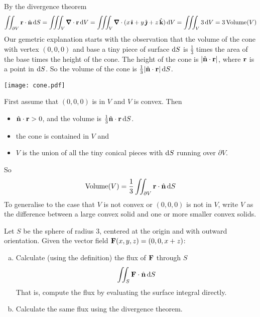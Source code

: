 \begin{solution} 
 By the divergence theorem
\begin{equation*}
\dblInt_{\partial V}\vr\cdot\hn\, \dee{S}
=\tripInt_V\vnabla\cdot\vr\,\dee{V}
=\tripInt_V\vnabla\cdot(x\,\hi+y\,\hj+z\,\hk)\,\dee{V}
=\tripInt_V 3\,\dee{V}
=3\,\text{Volume}(V)
\end{equation*}
Our gemetric explanation starts with the observation that
the volume of the cone with vertex $(0,0,0)$ and base a tiny piece of 
surface $\mathrm{d}S$ is $\frac{1}{3}$ times the area of the base times 
the height of the cone. The height of the cone is $|\hat{\mathbf{n}}\cdot\mathbf{r}|$, 
where $\mathbf{r}$ is a point in $\mathrm{d}S$. So the volume of the cone is $\frac{1}{3}|\hat{\mathbf{n}}\cdot\mathbf{r}|\,\mathrm{d}S$. 
\begin{center}
       \texttt{[image: cone.pdf]}
\end{center}
First assume that $(0,0,0)$ is in $V$ and $V$ is convex.
Then 
\begin{itemize}\itemsep1pt \parskip0pt  %
\item
$\hat{\mathbf{n}}\cdot\mathbf{r}>0$, and the volume is  $\frac{1}{3} \hat{\mathbf{n}}\cdot\mathbf{r} \,\mathrm{d}S$. 
\item 
the cone is contained in $V$ and
\item
 $V$ is the union of all the tiny conical pieces
with $\mathrm{d}S$ running over $\partial V$.
\end{itemize}
So
\begin{equation*}
\text{Volume}(V)=\frac{1}{3}\iint_{\partial V}\mathbf{r}\cdot\hat{\mathbf{n}}\, \mathrm{d}S
\end{equation*}
To generalise to the case that  $V$ is not convex or $(0,0,0)$ is not in $V$,
write $V$ as the difference between a large convex solid and one or more
smaller convex solids. 

\end{solution}

\begin{question}[M317 2016A] %
Let $S$ be the sphere of radius $3$, centered at the origin and 
with outward orientation. Given the vector field $\mathbf{F}(x,y,z) = (0, 0, x + z)$:
\begin{enumerate}[(a)]
\item
Calculate (using the definition) the flux of $\mathbf{F}$ through $S$
\begin{equation*}
   \iint_S \mathbf{F} \cdot \hat{\mathbf{n}}\,\mathrm{d}S
\end{equation*}
That is, compute the flux by evaluating the surface integral directly.

\item
   Calculate the same flux using the divergence theorem.
\end{enumerate}
\end{question}

